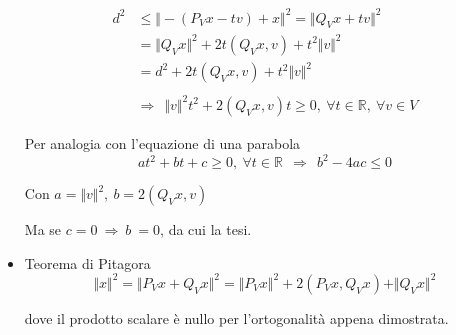 \documentclass[10pt,a4paper,twoside,openright]{book}
\begin{document}
\begin{dimostrazione}
\begin{itemize}
\begin{figure}[H]
\begin{tikzpicture}[x=0.75pt,y=0.75pt,yscale=-1,xscale=1]
		      		
		      	\end{tikzpicture}
		      	
		      \end{figure}
		      \FloatBarrier
		      \begin{align*}
		      	d^{2} & \leqslant \Vert -(P_{V} x-tv) +x\Vert ^{2} =\Vert Q_{V} x+tv\Vert ^{2}                                        \\
		      	      & =\Vert Q_{V} x\Vert ^{2} +2t(Q_{V} x,v) +t^{2}\Vert v\Vert ^{2}                                               \\
		      	      & =d^{2} +2t(Q_{V} x,v) +t^{2}\Vert v\Vert ^{2}                                                                 \\
		      	      &                                                                                                               \\
		      	      & \Rightarrow \ \ \Vert v\Vert ^{2} t^{2} +2(Q_{V} x,v) t\geqslant 0,\ \forall t\in \mathbb{R},\ \forall v\in V 
		      \end{align*}
		      
		      Per analogia con l'equazione di una parabola\begin{equation*}
		      at^{2} +bt+c\geqslant 0,\ \forall t\in \mathbb{R} \ \ \Rightarrow \ \ b^{2} -4ac\leqslant 0
		\end{equation*}
		
		Con $\displaystyle a=\Vert v\Vert ^{2},\ b=2(Q_{V} x,v)$
		
		Ma se $\displaystyle c=0\ \Rightarrow \ b\ =0$, da cui la tesi.
		\item Teorema di Pitagora\begin{equation*}
		      \Vert x\Vert ^{2} =\Vert P_{V} x+Q_{V} x\Vert ^{2} =\Vert P_{V} x\Vert ^{2} +2(P_{V} x,Q_{V} x) +\Vert Q_{V} x\Vert ^{2}
		\end{equation*}
		
		dove il prodotto scalare è nullo per l'ortogonalità appena dimostrata.
	\end{itemize}
\end{dimostrazione}
\end{document}
